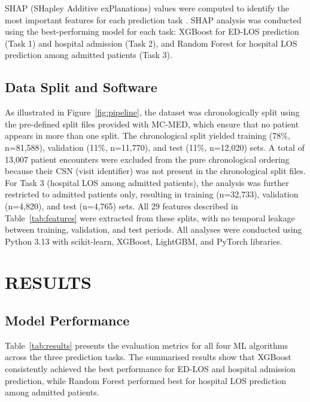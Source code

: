 \documentclass[harvard,article]{frontiersinFPHY_FAMS}
\begin{document}
SHAP (SHapley Additive exPlanations) values were computed to identify the most important features for each prediction task \cite{feretzakis2024, slack2022}. SHAP analysis was conducted using the best-performing model for each task: XGBoost for ED-LOS prediction (Task 1) and hospital admission (Task 2), and Random Forest for hospital LOS prediction among admitted patients (Task 3).

\subsection{Data Split and Software}

As illustrated in Figure~\ref{fig:pipeline}, the dataset was chronologically split using the pre-defined split files provided with MC-MED, which ensure that no patient appears in more than one split. The chronological split yielded training (78\%, n=81,588), validation (11\%, n=11,770), and test (11\%, n=12,020) sets. A total of 13,007 patient encounters were excluded from the pure chronological ordering because their CSN (visit identifier) was not present in the chronological split files. For Task 3 (hospital LOS among admitted patients), the analysis was further restricted to admitted patients only, resulting in training (n=32,733), validation (n=4,820), and test (n=4,765) sets. All 29 features described in Table~\ref{tab:features} were extracted from these splits, with no temporal leakage between training, validation, and test periods. All analyses were conducted using Python 3.13 with scikit-learn, XGBoost, LightGBM, and PyTorch libraries.

\section{RESULTS}

\subsection{Model Performance}

Table~\ref{tab:results} presents the evaluation metrics for all four ML algorithms across the three prediction tasks. The summarised results show that XGBoost consistently achieved the best performance for ED-LOS and hospital admission prediction, while Random Forest performed best for hospital LOS prediction among admitted patients.
\end{document}
